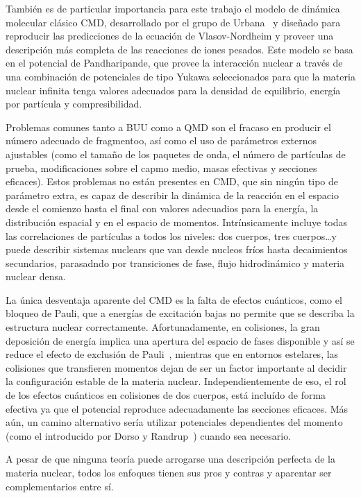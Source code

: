 También es de particular importancia para este trabajo el modelo de dinámica molecular clásico CMD, desarrollado por el grupo de Urbana~\cite{lenk_accuracy_1990} y diseñado para reproducir las predicciones de la ecuación de Vlasov-Nordheim y proveer una descripción más completa de las reacciones de iones pesados.
Este modelo se basa en el potencial de Pandharipande, que provee la interacción nuclear a través de una combinación de potenciales de tipo Yukawa seleccionados para que la materia nuclear infinita tenga valores adecuados para la densidad de equilibrio, energía por partícula y compresibilidad.

Problemas comunes tanto a BUU como a QMD son el fracaso en producir el número adecuado de fragmentoo, así como el uso de parámetros externos ajustables (como el tamaño de los paquetes de onda, el número de partículas de prueba, modificaciones sobre el capmo medio, masas efectivas y secciones eficaces).
Estos problemas no están presentes en CMD, que sin ningún tipo de parámetro extra, es capaz de describir la dinámica de la reacción en el espacio desde el comienzo hasta el final con valores adecuadios para la energía, la distribución espacial y en el espacio de momentos.
Intrínsicamente incluye todas las correlaciones de partículas a todos los niveles: dos cuerpos, tres cuerpos\ldots y puede describir sistemas nuclears que van desde nucleos fríos hasta decaimientos secundarios, parasadndo por transiciones de fase, flujo hidrodinámico y materia nuclear densa.

La única desventaja aparente del CMD es la falta de efectos cuánticos, como el bloqueo de Pauli, que a energías de excitación bajas no permite que se describa la estructura nuclear correctamente.
Afortunadamente, en colisiones, la gran deposición de energía implica una apertura del espacio de fases disponible y así se reduce el efecto de exclusión de Pauli~\cite{lopez_lectures_2000}, mientras que en entornos estelares, las colisiones que transfieren momentos dejan de ser un factor importante al decidir la configuración estable de la materia nuclear.
Independientemente de eso, el rol de los efectos cuánticos en colisiones de dos cuerpos, está incluído de forma efectiva ya que el potencial reproduce adecuadamente las secciones eficaces.
Más aún, un camino alternativo sería utilizar potenciales dependientes del momento (como el introducido por Dorso y Randrup~\cite{dorso_classical_1988}) cuando sea necesario.

A pesar de que ninguna teoría puede arrogarse una descripción perfecta de la materia nuclear, todos los enfoques tienen sus pros y contras y aparentar ser complementarios entre sí.

